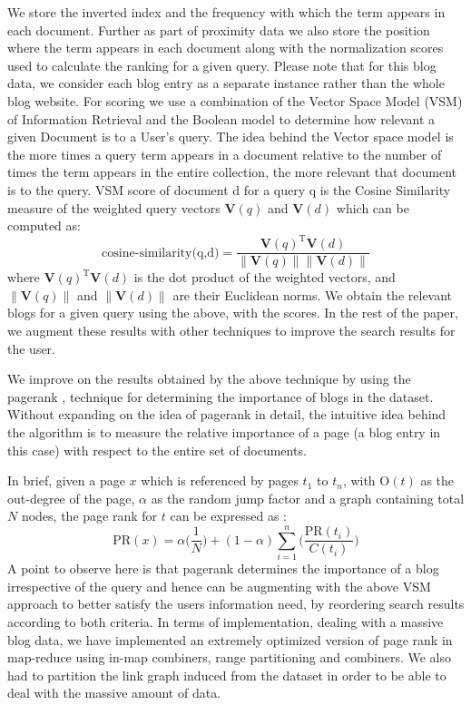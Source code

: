 \documentclass{acm_proc_article-sp}
\begin{document}
We store the inverted index and the frequency with which the term appears in each document. Further as part of proximity data we also store the position where the term appears in each document along with the normalization scores used to calculate the ranking for a given query. Please note that for this blog data, we consider each blog entry as a separate instance rather than the whole blog website.
For scoring we use a combination of the Vector Space Model (VSM) of Information Retrieval \cite{baeza1999modern} and the Boolean model to determine how relevant a given Document is to a User's query. The idea behind the Vector space model is the more times a query term appears in a document relative to the number of times the term appears in the entire collection, the more relevant that document is to the query. VSM score of document d for a query q is the Cosine Similarity measure of the weighted query vectors $\mathbf{V}(q)$ and $\mathbf{V}(d)$ which can be computed as: 
\begin{equation}
\text{cosine-similarity(q,d)} = \frac{\mathbf{V}(q)^{\text{T}}\mathbf{V}(d)}{\|\mathbf{V}(q)\|\|\mathbf{V}(d)\|}
\end{equation}
where $\mathbf{V}(q)^{\text{T}}\mathbf{V}(d)$ is the dot product of the weighted vectors, and $\|\mathbf{V}(q)\|$ and $\|\mathbf{V}(d)\|$ are their Euclidean norms. We obtain the relevant blogs for a given query using the above, with the scores. In the rest of the paper, we augment these results with other techniques to improve the search results for the user.

We improve on the results obtained by the above technique by using the pagerank \cite{page1999pagerank}\cite{brin1998anatomy}, technique for determining the importance of blogs in the dataset. Without expanding on the idea of pagerank in detail, the intuitive idea behind the algorithm is to measure the relative importance of a page (a blog entry in this case) with respect to the entire set of documents.

In brief, given a page $x$ which is referenced by pages $t_{1}$ to $t_{n}$, with $\text{O}(t)$ as the out-degree of the page, $\alpha$ as the random jump factor and a graph containing total $N$ nodes, the page rank for $t$ can be expressed as : 
\begin{equation}
\text{PR}(x) = \alpha\bigl(\frac{1}{N}\bigr) + (1-\alpha)\sum_{i=1}^{n}\bigl(\frac{\text{PR}(t_{i})}{C(t_{i})}\bigr)
\end{equation}
A point to observe here is that pagerank determines the importance of a blog irrespective of the query and hence can be augmenting with the above VSM approach to better satisfy the users information need, by reordering search results according to both criteria. In terms of implementation, dealing with a massive blog data, we have implemented an extremely optimized version of page rank in map-reduce using in-map combiners, range partitioning and combiners. We also had to partition the link graph induced from the dataset in order to be able to deal with the massive amount of data.
\end{document}
